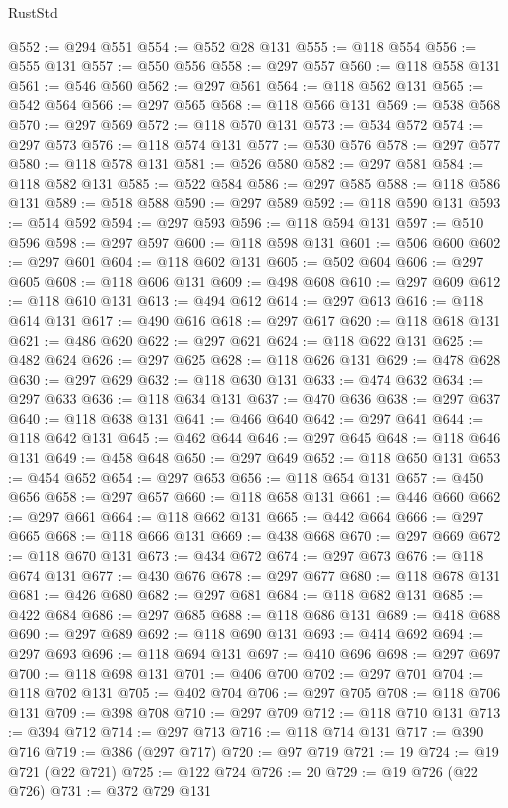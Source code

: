 \begin{lexlean}{RustStd}
\begin{coremodule}
@552 := @294 @551
@554 := @552 @28 @131
@555 := @118 @554
@556 := @555 @131
@557 := @550 @556
@558 := @297 @557
@560 := @118 @558 @131
@561 := @546 @560
@562 := @297 @561
@564 := @118 @562 @131
@565 := @542 @564
@566 := @297 @565
@568 := @118 @566 @131
@569 := @538 @568
@570 := @297 @569
@572 := @118 @570 @131
@573 := @534 @572
@574 := @297 @573
@576 := @118 @574 @131
@577 := @530 @576
@578 := @297 @577
@580 := @118 @578 @131
@581 := @526 @580
@582 := @297 @581
@584 := @118 @582 @131
@585 := @522 @584
@586 := @297 @585
@588 := @118 @586 @131
@589 := @518 @588
@590 := @297 @589
@592 := @118 @590 @131
@593 := @514 @592
@594 := @297 @593
@596 := @118 @594 @131
@597 := @510 @596
@598 := @297 @597
@600 := @118 @598 @131
@601 := @506 @600
@602 := @297 @601
@604 := @118 @602 @131
@605 := @502 @604
@606 := @297 @605
@608 := @118 @606 @131
@609 := @498 @608
@610 := @297 @609
@612 := @118 @610 @131
@613 := @494 @612
@614 := @297 @613
@616 := @118 @614 @131
@617 := @490 @616
@618 := @297 @617
@620 := @118 @618 @131
@621 := @486 @620
@622 := @297 @621
@624 := @118 @622 @131
@625 := @482 @624
@626 := @297 @625
@628 := @118 @626 @131
@629 := @478 @628
@630 := @297 @629
@632 := @118 @630 @131
@633 := @474 @632
@634 := @297 @633
@636 := @118 @634 @131
@637 := @470 @636
@638 := @297 @637
@640 := @118 @638 @131
@641 := @466 @640
@642 := @297 @641
@644 := @118 @642 @131
@645 := @462 @644
@646 := @297 @645
@648 := @118 @646 @131
@649 := @458 @648
@650 := @297 @649
@652 := @118 @650 @131
@653 := @454 @652
@654 := @297 @653
@656 := @118 @654 @131
@657 := @450 @656
@658 := @297 @657
@660 := @118 @658 @131
@661 := @446 @660
@662 := @297 @661
@664 := @118 @662 @131
@665 := @442 @664
@666 := @297 @665
@668 := @118 @666 @131
@669 := @438 @668
@670 := @297 @669
@672 := @118 @670 @131
@673 := @434 @672
@674 := @297 @673
@676 := @118 @674 @131
@677 := @430 @676
@678 := @297 @677
@680 := @118 @678 @131
@681 := @426 @680
@682 := @297 @681
@684 := @118 @682 @131
@685 := @422 @684
@686 := @297 @685
@688 := @118 @686 @131
@689 := @418 @688
@690 := @297 @689
@692 := @118 @690 @131
@693 := @414 @692
@694 := @297 @693
@696 := @118 @694 @131
@697 := @410 @696
@698 := @297 @697
@700 := @118 @698 @131
@701 := @406 @700
@702 := @297 @701
@704 := @118 @702 @131
@705 := @402 @704
@706 := @297 @705
@708 := @118 @706 @131
@709 := @398 @708
@710 := @297 @709
@712 := @118 @710 @131
@713 := @394 @712
@714 := @297 @713
@716 := @118 @714 @131
@717 := @390 @716
@719 := @386 (@297 @717)
@720 := @97 @719
@721 := 19
@724 := @19 @721 (@22 @721)
@725 := @122 @724
@726 := 20
@729 := @19 @726 (@22 @726)
@731 := @372 @729 @131

\end{coremodule}
\end{lexlean}
